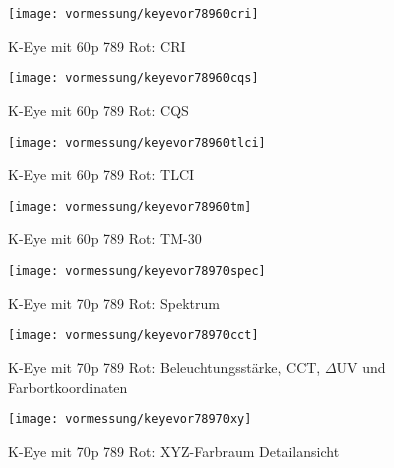 \documentclass[pagesize,paper=A4,fontsize=12pt,utf8,numbers=noenddot,bibliography=totoc,listof=totoc,DIV=11,BCOR=1mm]{scrreprt}
\begin{document}
\begin{figure}[htp]     %
\centering
\texttt{[image: vormessung/keyevor78960cri]} 
\caption {K-Eye mit 60p 789 Rot: CRI} 
\end{figure}

\begin{figure}[htp]     %
\centering
\texttt{[image: vormessung/keyevor78960cqs]} 
\caption {K-Eye mit 60p 789 Rot: CQS} 
\end{figure}

\begin{figure}[htp]     %
\centering
\texttt{[image: vormessung/keyevor78960tlci]} 
\caption {K-Eye mit 60p 789 Rot: TLCI} 
\end{figure}

\begin{figure}[htp]     %
\centering
\texttt{[image: vormessung/keyevor78960tm]} 
\caption {K-Eye mit 60p 789 Rot: TM-30} 
\end{figure}




\begin{figure}[htp]     %
\centering
\texttt{[image: vormessung/keyevor78970spec]} 
\caption {K-Eye mit 70p 789 Rot: Spektrum} 
\end{figure}

\begin{figure}[htp]     %
\centering
\texttt{[image: vormessung/keyevor78970cct]} 
\caption {K-Eye mit 70p 789 Rot: Beleuchtungsstärke, CCT, $\Delta$UV und Farbortkoordinaten} 
\end{figure}

\begin{figure}[htp]     %
\centering
\texttt{[image: vormessung/keyevor78970xy]} 
\caption {K-Eye mit 70p 789 Rot: XYZ-Farbraum Detailansicht} 
\end{figure}
\end{document}
